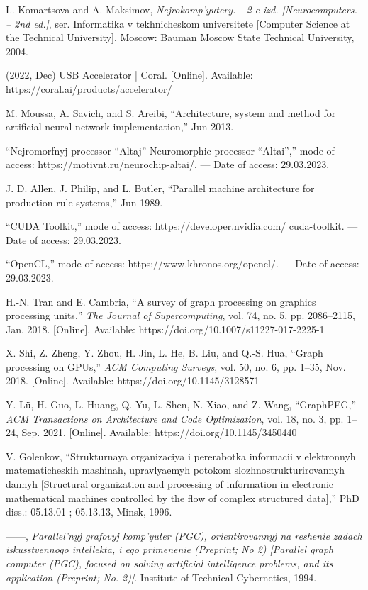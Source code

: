 \documentclass{article}
\begin{document}
{\begin{multicols}{2}
{\begin{thebibliography}{65}
    \item L. Komartsova and A. Maksimov, \textit{Nejrokomp’yutery. - 2-e izd.
[Neurocomputers. – 2nd ed.]}, ser. Informatika v tekhnicheskom
universitete [Computer Science at the Technical University].
Moscow: Bauman Moscow State Technical University, 2004.
    \item (2022, Dec) USB Accelerator | Coral. [Online]. Available:
https://coral.ai/products/accelerator/
    \item M. Moussa, A. Savich, and S. Areibi, “Architecture, system and
method for artificial neural network implementation,” Jun 2013.
    \item “Nejromorfnyj processor “Altaj” Neuromorphic processor “Altai”,”
mode of access: https://motivnt.ru/neurochip-altai/. — Date of
access: 29.03.2023.
    \item J. D. Allen, J. Philip, and L. Butler, “Parallel machine architecture
for production rule systems,” Jun 1989.
    \item “CUDA Toolkit,” mode of access: https://developer.nvidia.com/
cuda-toolkit. — Date of access: 29.03.2023.

    \item “OpenCL,” mode of access: https://www.khronos.org/opencl/. —
Date of access: 29.03.2023.
    \item H.-N. Tran and E. Cambria, “A survey of graph processing
on graphics processing units,” \textit{The Journal of Supercomputing},
vol. 74, no. 5, pp. 2086–2115, Jan. 2018. [Online]. Available:
https://doi.org/10.1007/s11227-017-2225-1

    \item X. Shi, Z. Zheng, Y. Zhou, H. Jin, L. He, B. Liu, and
Q.-S. Hua, “Graph processing on GPUs,” \textit{ACM Computing
Surveys}, vol. 50, no. 6, pp. 1–35, Nov. 2018. [Online]. Available:
https://doi.org/10.1145/3128571

    \item Y. Lü, H. Guo, L. Huang, Q. Yu, L. Shen, N. Xiao, and
Z. Wang, “GraphPEG,” \textit{ACM Transactions on Architecture and
Code Optimization}, vol. 18, no. 3, pp. 1–24, Sep. 2021. [Online].
Available: https://doi.org/10.1145/3450440
    \item V. Golenkov, “Strukturnaya organizaciya i pererabotka informacii
v elektronnyh matematicheskih mashinah, upravlyaemyh potokom
slozhnostrukturirovannyh dannyh [Structural organization and
processing of information in electronic mathematical machines
controlled by the flow of complex structured data],” PhD diss.:
05.13.01 ; 05.13.13, Minsk, 1996.
    \item ——, \textit{Parallel’nyj grafovyj komp’yuter (PGC), orientirovannyj
na reshenie zadach iskusstvennogo intellekta, i ego primenenie
(Preprint; No 2) [Parallel graph computer (PGC), focused
on solving artificial intelligence problems, and its application
(Preprint; No. 2)]}. Institute of Technical Cybernetics, 1994.


\end{thebibliography}}
\end{multicols}}
\end{document}
